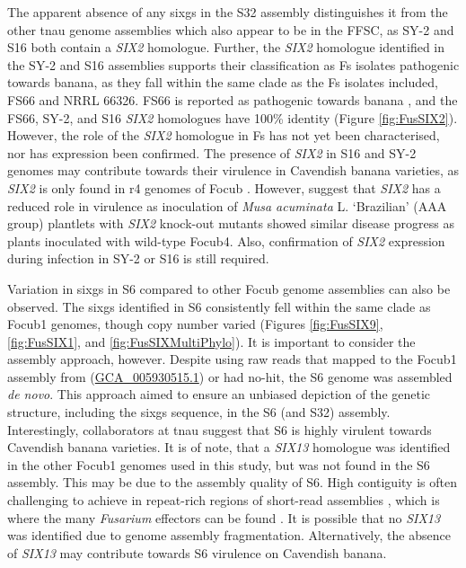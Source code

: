 The apparent absence of any \acp{sixg} in the S32 assembly distinguishes it from the other \ac{tnau} genome assemblies which also appear to be in the \ac{FFSC}, as SY-2 and S16 both contain a \textit{SIX2} homologue. Further, the \textit{SIX2} homologue identified in the SY-2 and S16 assemblies supports their classification as \ac{Fs} isolates pathogenic towards banana, as they fall within the same clade as the \ac{Fs} isolates included, FS66 and NRRL 66326. FS66 is reported as pathogenic towards banana \parencite{Cui2021}, and the FS66, SY-2, and S16 \textit{SIX2} homologues have 100\% identity (Figure \ref{fig:FusSIX2}). However, the role of the \textit{SIX2} homologue in \ac{Fs} has not yet been characterised, nor has expression been confirmed. The presence of \textit{SIX2} in S16 and SY-2 genomes may contribute towards their virulence in Cavendish banana varieties, as \textit{SIX2} is only found in \ac{r4} genomes of \ac{Focub} \parencite{Czislowski2018}. However, \textcite{An2019} suggest that \textit{SIX2} has a reduced role in virulence as inoculation of \textit{Musa acuminata} L. ‘Brazilian’ (AAA group) plantlets with \textit{SIX2} knock-out mutants showed similar disease progress as plants inoculated with wild-type \ac{Focub4}. Also, confirmation of \textit{SIX2} expression during infection in SY-2 or S16 is still required. 

Variation in \acp{sixg} in S6 compared to other \ac{Focub} genome assemblies can also be observed. The \acp{sixg} identified in S6 consistently fell within the same clade as \ac{Focub1} genomes, though copy number varied (Figures \ref{fig:FusSIX9}, \ref{fig:FusSIX1}, and \ref{fig:FusSIXMultiPhylo}). It is important to consider the assembly approach, however. Despite using raw reads that mapped to the \ac{Focub1} assembly from \textcite{Asai2019} (\href{https://www.ncbi.nlm.nih.gov/datasets/genome/GCA_005930515.1/}{GCA\_005930515.1}) or had no-hit, the S6 genome was assembled \textit{de novo}. This approach aimed to ensure an unbiased depiction of the genetic structure, including the \acp{sixg} sequence, in the S6 (and S32) assembly. Interestingly, collaborators at \ac{tnau} suggest that S6 is highly virulent towards Cavendish banana varieties. It is of note, that a \textit{SIX13} homologue was identified in the other \ac{Focub1} genomes used in this study, but was not found in the S6 assembly.  This may be due to the assembly quality of S6. High contiguity is often challenging to achieve in repeat-rich regions of short-read assemblies \parencite{Treangen2012, Peona2021}, which is where the many \textit{Fusarium} effectors can be found \parencite{Ma2010, Schmidt2013, Armitage2018}. It is possible that no \textit{SIX13} was identified due to genome assembly fragmentation. Alternatively, the absence of \textit{SIX13} may contribute towards S6 virulence on Cavendish banana. 

